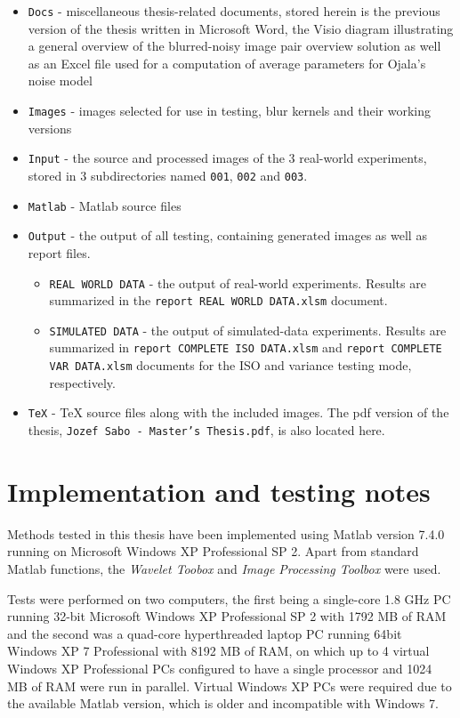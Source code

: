 \documentclass[12pt,notitlepage]{report}
\begin{document}
\begin{itemize}
	\item \texttt{Docs} - miscellaneous thesis-related documents, stored herein is the previous version of the thesis written in Microsoft Word, the Visio diagram illustrating a general overview of the blurred-noisy image pair overview solution as well as an Excel file used for a computation of average parameters for Ojala's noise model
	\item \texttt{Images} - images selected for use in testing, blur kernels and their working versions
	\item \texttt{Input} - the source and processed images of the 3 real-world experiments, stored in 3 subdirectories named \texttt{001}, \texttt{002} and \texttt{003}. 
	\item \texttt{Matlab} - Matlab source files
	\item \texttt{Output} - the output of all testing, containing generated images as well as report files. 
	\begin{itemize}
		\item \texttt{REAL WORLD DATA} - the output of real-world experiments. Results are summarized in the \texttt{report REAL WORLD DATA.xlsm} document. 
		\item \texttt{SIMULATED DATA} - the output of simulated-data experiments. Results are summarized in \texttt{report COMPLETE ISO DATA.xlsm} and \texttt{report COMPLETE VAR DATA.xlsm} documents for the ISO and variance testing mode, respectively.
	\end{itemize}
	\item \texttt{TeX} - TeX source files along with the included images. The pdf version of the thesis, \texttt{Jozef Sabo - Master's Thesis.pdf}, is also located here.
\end{itemize} 

\chapter{Implementation and testing notes}
\label{chap:notes}

Methods tested in this thesis have been implemented using Matlab version 7.4.0 running on Microsoft Windows XP Professional SP 2. Apart from standard Matlab functions, the {\em Wavelet Toobox} and {\em Image Processing Toolbox} were used.

Tests were performed on two computers, the first being a single-core 1.8 GHz PC running 32-bit Microsoft Windows XP Professional SP 2 with 1792 MB of RAM and the second was a quad-core hyperthreaded laptop PC running 64bit 
Windows XP 7 Professional with 8192 MB of RAM, on which up to 4 virtual Windows XP Professional PCs configured to have a single processor and 1024 MB of RAM were run in parallel. Virtual Windows XP PCs were required due to the available Matlab version, which is older and incompatible with Windows 7.
\end{document}
